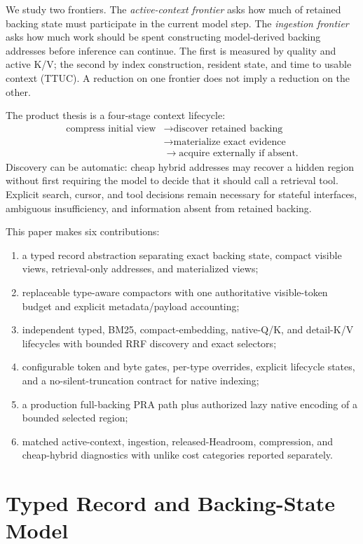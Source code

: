 \documentclass[11pt]{article}
\begin{document}
We study two frontiers. The \emph{active-context frontier} asks how much of
retained backing state must participate in the current model step. The
\emph{ingestion frontier} asks how much work should be spent constructing
model-derived backing addresses before inference can continue. The first is
measured by quality and active K/V; the second by index construction, resident
state, and time to usable context (TTUC). A reduction on one frontier does not
imply a reduction on the other.

The product thesis is a four-stage context lifecycle:
\[
\begin{aligned}
\text{compress initial view} &\rightarrow \text{discover retained backing}\\
&\rightarrow \text{materialize exact evidence}\\
&\rightarrow \text{acquire externally if absent}.
\end{aligned}
\]
Discovery can be automatic: cheap hybrid addresses may recover a hidden region
without first requiring the model to decide that it should call a retrieval
tool. Explicit search, cursor, and tool decisions remain necessary for
stateful interfaces, ambiguous insufficiency, and information absent from
retained backing.

This paper makes six contributions:
\begin{enumerate}[leftmargin=*]
  \item a typed record abstraction separating exact backing state, compact
  visible views, retrieval-only addresses, and materialized views;
  \item replaceable type-aware compactors with one authoritative visible-token
  budget and explicit metadata/payload accounting;
  \item independent typed, BM25, compact-embedding, native-Q/K, and detail-K/V
  lifecycles with bounded RRF discovery and exact selectors;
  \item configurable token and byte gates, per-type overrides, explicit
  lifecycle states, and a no-silent-truncation contract for native indexing;
  \item a production full-backing PRA path plus authorized lazy native encoding
  of a bounded selected region;
  \item matched active-context, ingestion, released-Headroom, compression, and
  cheap-hybrid diagnostics with unlike cost categories reported separately.
\end{enumerate}

\section{Typed Record and Backing-State Model}
\end{document}
